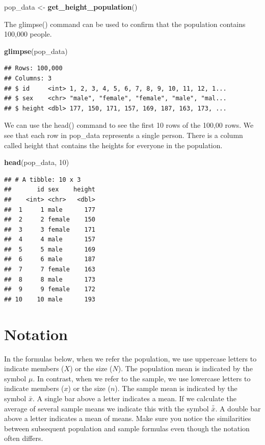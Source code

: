 \documentclass[
]{krantz}
\makeatletter
\newenvironment{Shaded}{\begin{snugshade}}{\end{snugshade}}
\newcommand{\DecValTok}[1]{\textcolor[rgb]{0.06,0.06,0.06}{#1}}
\newcommand{\KeywordTok}[1]{\textcolor[rgb]{0.27,0.27,0.27}{\textbf{#1}}}
\newcommand{\NormalTok}[1]{#1}
\newcommand{\StringTok}[1]{\textcolor[rgb]{0.5,0.5,0.5}{#1}}
\newenvironment{kframe}{%
\medskip{}
\setlength{\fboxsep}{.8em}
 \def\at@end@of@kframe{}%
 \ifinner\ifhmode%
  \def\at@end@of@kframe{\end{minipage}}%
  \begin{minipage}{\columnwidth}%
 \fi\fi%
 \def\FrameCommand##1{\hskip\@totalleftmargin \hskip-\fboxsep
 \colorbox{shadecolor}{##1}\hskip-\fboxsep
     \hskip-\linewidth \hskip-\@totalleftmargin \hskip\columnwidth}%
 \MakeFramed {\advance\hsize-\width
   \@totalleftmargin\z@ \linewidth\hsize
   \@setminipage}}%
 {\par\unskip\endMakeFramed%
 \at@end@of@kframe}
\renewenvironment{Shaded}{\begin{kframe}}{\end{kframe}}
\makeatother
\begin{document}
\begin{Shaded}
\begin{Highlighting}[]
\NormalTok{pop_data <-}\StringTok{ }\KeywordTok{get_height_population}\NormalTok{() }
\end{Highlighting}
\end{Shaded}

The glimpse() command can be used to confirm that the population contains 100,000 people.

\begin{Shaded}
\begin{Highlighting}[]
\KeywordTok{glimpse}\NormalTok{(pop_data)}
\end{Highlighting}
\end{Shaded}

\begin{verbatim}
## Rows: 100,000
## Columns: 3
## $ id     <int> 1, 2, 3, 4, 5, 6, 7, 8, 9, 10, 11, 12, 1...
## $ sex    <chr> "male", "female", "female", "male", "mal...
## $ height <dbl> 177, 150, 171, 157, 169, 187, 163, 173, ...
\end{verbatim}

We can use the head() command to see the first 10 rows of the 100,00 rows. We see that each row in pop\_data represents a single person. There is a column called height that contains the heights for everyone in the population.

\begin{Shaded}
\begin{Highlighting}[]
\KeywordTok{head}\NormalTok{(pop_data, }\DecValTok{10}\NormalTok{)}
\end{Highlighting}
\end{Shaded}

\begin{verbatim}
## # A tibble: 10 x 3
##       id sex    height
##    <int> <chr>   <dbl>
##  1     1 male      177
##  2     2 female    150
##  3     3 female    171
##  4     4 male      157
##  5     5 male      169
##  6     6 male      187
##  7     7 female    163
##  8     8 male      173
##  9     9 female    172
## 10    10 male      193
\end{verbatim}

\hypertarget{notation-1}{%
\section{Notation}\label{notation-1}}

In the formulas below, when we refer the population, we use uppercase letters to indicate members (\(X\)) or the size (\(N\)). The population mean is indicated by the symbol \(\mu\). In contrast, when we refer to the sample, we use lowercase letters to indicate members (\(x\)) or the size (\(n\)). The sample mean is indicated by the symbol \(\bar{x}\). A single bar above a letter indicates a mean. If we calculate the average of several sample means we indicate this with the symbol \(\bar{\bar{x}}\). A double bar above a letter indicates a mean of means. Make sure you notice the similarities between subsequent population and sample formulas even though the notation often differs.
\end{document}
